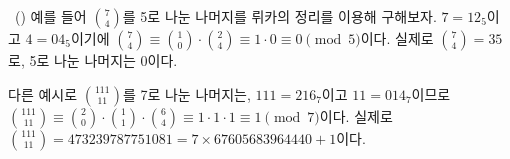\begin{problem}{\kcpcprobserver\ (\kcpcprobservershort)}
    예를 들어 $\binom{7}{4}$를 5로 나눈 나머지를 뤼카의 정리를 이용해 구해보자. $7 = 12_{5}$이고 $4 = 04_{5}$이기에 $ \binom{7}{4} \equiv \binom{1}{0} \cdot \binom{2}{4} \equiv 1 \cdot 0 \equiv 0 \pmod 5$이다. 실제로 $\binom{7}{4} = 35$로, 5로 나눈 나머지는 0이다.
    
    다른 예시로 $ \binom{111}{11} $를 7로 나눈 나머지는, $ 111 = 216_{7}$이고 $ 11 = 014_{7} $이므로 $ \binom{111}{11} \equiv \binom{2}{0} \cdot \binom{1}{1} \cdot \binom{6}{4} \equiv 1 \cdot 1 \cdot 1 \equiv 1 \pmod 7 $이다. 실제로 $ \binom{111}{11} = 473239787751081 = 7 \times 67605683964440 + 1$이다.
    
\end{problem}

